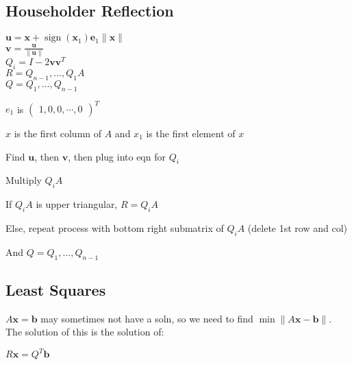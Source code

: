 \documentclass[10pt,letterpaper]{article}
\newenvironment{tight_item}
{\begin{itemize}
\setlength{\parskip}{0pt}
\setlength{\parsep}{0pt}
\setlength{\itemsep}{0pt}
\setlength{\parsep}{0pt}
\setlength{\topsep}{0pt}
\setlength{\partopsep}{0pt}
\setlength{\leftmargin}{0em}
\setlength{\labelwidth}{0em}
\setlength{\labelsep}{0em} }
{\end{itemize}}
\newenvironment{tight_enum}
{\begin{enumerate}
\setlength{\parskip}{0pt}
\setlength{\parsep}{0pt}
\setlength{\itemsep}{0pt}
\setlength{\parsep}{0pt}
\setlength{\topsep}{0pt}
\setlength{\partopsep}{0pt}
\setlength{\leftmargin}{0em}
\setlength{\labelwidth}{0em}
\setlength{\labelsep}{0em} }
{\end{enumerate}}
\begin{document}
{\begin{multicols*}{5}
\subsection{Householder Reflection}
\begin{center}
$\textbf{u} = \textbf{x} + \operatorname{sign}(\textbf{x}_{1}) \textbf{e}_{1} \| \textbf{x} \|$\\
$\textbf{v} = \frac{\textbf{u}}{ \| \textbf{u} \| }$ \\
$Q_{i} = I - 2 \textbf{v} \textbf{v}^{T}$ \\
$R = Q_{n-1},\dots,Q_{1}A$ \\
$Q = Q_{1},\dots,Q_{n-1}$
\end{center}
\begin{tight_item}
\item $e_{1}$ is $\begin{pmatrix}1,0,0,\cdots,0\end{pmatrix}^{T}$
\item $x$ is the first column of $A$ and $x_{1}$ is the first element of $x$
\end{tight_item}
\begin{tight_enum}
\item Find $\textbf{u}$, then $\textbf{v}$, then plug into eqn for $Q_{i}$
\item Multiply $Q_{i}A$
\item If $Q_{i}A$ is upper triangular, $R = Q_{i}A$
\item Else, repeat process with bottom right submatrix of $Q_{i}A$ (delete 1st row and col)
\item And $Q = Q_{1},\dots,Q_{n-1}$
\end{tight_enum}

\subsection{Least Squares}
\begin{tight_item}
\item $A \textbf{x} = \textbf{b}$ may sometimes not have a soln, so we need to
find $\min{ \| A \textbf{x} - \textbf{b} \|}$. The solution of this is the
solution of:
\end{tight_item}
\begin{center}
$R \textbf{x} = Q^{T} \textbf{b}$
\end{center}


\end{multicols*}}
\end{document}
